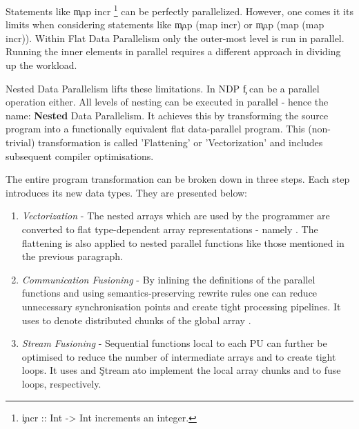     
    Statements like \c{map incr}
    \footnote{\c{incr :: Int -> Int} increments an integer.}
    can be perfectly parallelized.
    However, one comes it its limits when considering statements like \c{map (map incr)} or \c{map (map (map incr))}.
    Within Flat Data Parallelism only the outer-most level is run in parallel.
    Running the inner elements in parallel requires a different approach in dividing up the workload.
    
    \p
    Nested Data Parallelism lifts these limitations.
    In NDP \c{f} can be a parallel operation either. All levels of nesting can
    be executed in parallel - hence the name: \textbf{Nested} Data Parallelism.
    It achieves this by transforming the source program into a functionally
    equivalent flat data-parallel program. This (non-trivial) transformation
    is called 'Flattening' or 'Vectorization' and includes subsequent compiler optimisations.
    
    The entire program transformation can be broken down in three steps.
    Each step introduces its new data types. They are presented below:
    \begin{enumerate}
      \item \emph{Vectorization} -
        The nested arrays \pan{} which are used by the programmer
        are converted to flat type-dependent array representations - namely  \pav{}.
        The flattening is also applied to nested parallel functions like
        those mentioned in the previous paragraph.
      \item \emph{Communication Fusioning} -
        By inlining the definitions of the parallel functions and
        using semantics-preserving rewrite rules one can
        reduce unnecessary synchronisation points and
        create tight processing pipelines. It uses \pad{} to denote
        distributed chunks of the global array \pav{}.
      \item \emph{Stream Fusioning} -
        Sequential functions local to each PU can further
        be optimised to reduce the number of intermediate arrays
        and to create tight loops.
        It uses  and \c{Stream a}\footnotemark to
        implement the local array chunks and to fuse loops, respectively.
    \end{enumerate}
    
